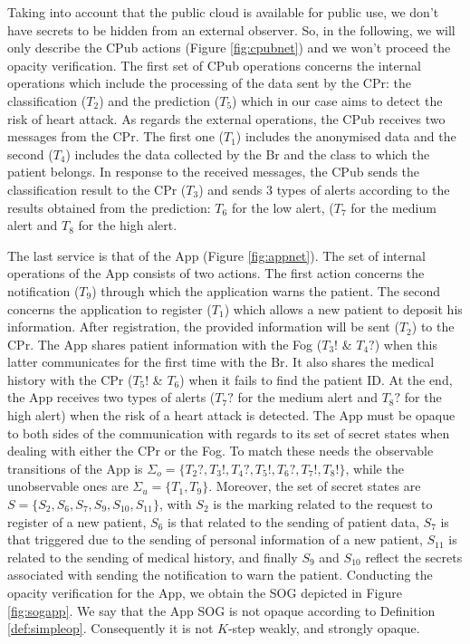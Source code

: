 
Taking into account that the public cloud is available for public use, we don't have secrets to be hidden from an external observer. So, in the following, we will only describe the CPub actions (Figure \ref{fig:cpubnet}) and we won't proceed the opacity verification. The first set of CPub operations concerns the internal operations which include the processing of the data sent by the CPr: the classification ($T_2$) and the prediction ($T_5$) which in our case aims to detect the risk of heart attack. As regards the external operations, the CPub receives two messages from the CPr. The first one ($T_1$) includes the anonymised data and the second ($T_4$) includes the data collected by the Br and the class to which the patient belongs. In response to the received messages, the CPub sends the classification result to the CPr ($T_3$) and sends 3 types of alerts according to the results obtained from the prediction: $T_6$ for the low alert, ($T_7$ for the medium alert and $T_8$ for the high alert.

The last service is that of the App (Figure \ref{fig:appnet}). The set of internal operations of the App consists of two actions. The first action concerns the notification ($T_9$) through which the application warns the patient. The second concerns the application to register ($T_1$) which allows a new patient to deposit his information. After registration, the provided information will be sent ($T_2$) to the CPr. The App shares patient information with the Fog ($T_3!$ \& $T_4?$) when this latter communicates for the first time with the Br. It also shares the medical history with the CPr ($T_5!$ \& $T_6$) when it fails to find the patient ID. At the end, the App receives two types of alerts ($T_7?$ for the medium alert and $T_8?$ for the high alert) when the risk of a heart attack is detected. The App must be opaque to both sides of the communication with regards to its set of secret states when dealing with either the CPr or the Fog. To match these needs the
observable transitions of the App is  $\Sigma_{o}=\{T_2?,T_3!,T_4?,T_5!,T_6?,T_7!,T_8!\}$, while the unobservable ones are $\Sigma_{u}=\{T_1,T_9\}$. Moreover, the set of secret states are $S=\{S_2,S_6,S_7,S_9,S_{10},S_{11}\}$, with $S_2$ is the marking related to the request to register of a new patient, $S_6$ is that related to the sending of patient data, $S_7$ is that triggered due to the sending of personal information of a new patient, $S_{11}$ is related to the sending of medical history, and finally $S_9$ and $S_{10}$ reflect the secrets associated with sending the notification to warn the patient. Conducting the opacity verification for the App, we obtain the SOG depicted in Figure \ref{fig:sogapp}. We say that the App SOG is not opaque according to Definition \ref{def:simpleop}. Consequently it is not
$K$-step weakly, and strongly opaque.